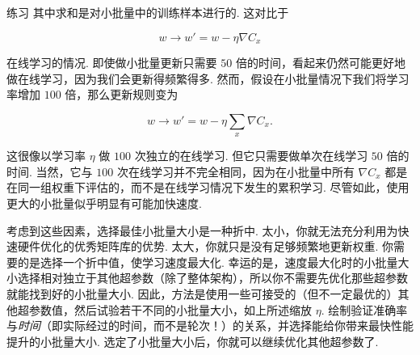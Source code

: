 \begin{exerciseBox}{练习}
\noindent 其中求和是对小批量中的训练样本进行的. 这对比于

\begin{equation}
w \rightarrow w' = w-\eta \nabla C_x
\tag{101}
\end{equation}

\noindent 在线学习的情况. 即使做小批量更新只需要 $50$ 倍的时间，看起来仍然可能更好地做在线学习，因为我们会更新得频繁得多. 然而，假设在小批量情况下我们将学习率增加 $100$ 倍，那么更新规则变为

\begin{equation}
w \rightarrow w' = w-\eta \sum_x \nabla C_x.
\tag{102}
\end{equation}

\noindent 这很像以学习率 $\eta$ 做 $100$ 次独立的在线学习. 但它只需要做单次在线学习 $50$ 倍的时间. 当然，它与 $100$ 次在线学习并不完全相同，因为在小批量中所有 $\nabla C_x$ 都是在同一组权重下评估的，而不是在线学习情况下发生的累积学习. 尽管如此，使用更大的小批量似乎明显有可能加快速度.

考虑到这些因素，选择最佳小批量大小是一种折中. 太小，你就无法充分利用为快速硬件优化的优秀矩阵库的优势. 太大，你就只是没有足够频繁地更新权重. 你需要的是选择一个折中值，使学习速度最大化. 幸运的是，速度最大化时的小批量大小选择相对独立于其他超参数（除了整体架构），所以你不需要先优化那些超参数就能找到好的小批量大小. 因此，方法是使用一些可接受的（但不一定最优的）其他超参数值，然后试验若干不同的小批量大小，如上所述缩放 $\eta$. 绘制验证准确率与\emph{时间}（即实际经过的时间，而不是轮次！）的关系，并选择能给你带来最快性能提升的小批量大小. 选定了小批量大小后，你就可以继续优化其他超参数了.


\end{exerciseBox}

